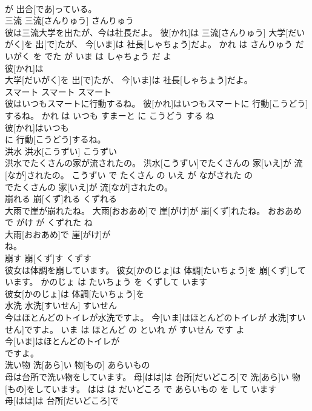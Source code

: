 \documentclass[8pt]{extreport}
\begin{document}
\begin{CJK}{UTF8}{min}
\\	が 出合[であ]っている。			
\\	三流	三流[さんりゅう]	さんりゅう	
\\	彼は三流大学を出たが、今は社長だよ。	彼[かれ]は 三流[さんりゅう] 大学[だいがく]を 出[で]たが、 今[いま]は 社長[しゃちょう]だよ。	かれ は さんりゅう だいがく を でた が いま は しゃちょう だ よ	
\\	彼[かれ]は
\\	大学[だいがく]を 出[で]たが、 今[いま]は 社長[しゃちょう]だよ。			
\\	スマート	スマート	スマート	
\\	彼はいつもスマートに行動するね。	彼[かれ]はいつもスマートに 行動[こうどう]するね。	かれ は いつも すまーと に こうどう する ね	
\\	彼[かれ]はいつも
\\	に 行動[こうどう]するね。			
\\	洪水	洪水[こうずい]	こうずい	
\\	洪水でたくさんの家が流されたの。	洪水[こうずい]でたくさんの 家[いえ]が 流[なが]されたの。	こうずい で たくさん の いえ が ながされた の	
\\	でたくさんの 家[いえ]が 流[なが]されたの。			
\\	崩れる	崩[くず]れる	くずれる	
\\	大雨で崖が崩れたね。	大雨[おおあめ]で 崖[がけ]が 崩[くず]れたね。	おおあめ で がけ が くずれた ね	
\\	大雨[おおあめ]で 崖[がけ]が
\\	ね。			
\\	崩す	崩[くず]す	くずす	
\\	彼女は体調を崩しています。	彼女[かのじょ]は 体調[たいちょう]を 崩[くず]しています。	かのじょ は たいちょう を くずして います	
\\	彼女[かのじょ]は 体調[たいちょう]を
\\	水洗	水洗[すいせん]	すいせん	
\\	今はほとんどのトイレが水洗ですよ。	今[いま]はほとんどのトイレが 水洗[すいせん]ですよ。	いま は ほとんど の といれ が すいせん です よ	
\\	今[いま]はほとんどのトイレが
\\	ですよ。			
\\	洗い物	洗[あら]い 物[もの]	あらいもの	
\\	母は台所で洗い物をしています。	母[はは]は 台所[だいどころ]で 洗[あら]い 物[もの]をしています。	はは は だいどころ で あらいもの を して います	
\\	母[はは]は 台所[だいどころ]で

\end{CJK}
\end{document}
